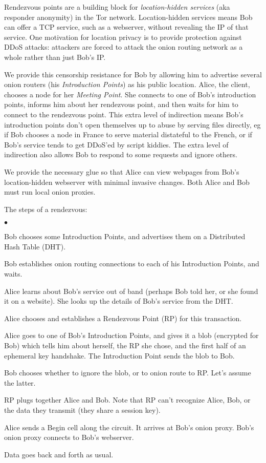 \documentclass[times,10pt,twocolumn]{article}
\newenvironment{tightlist}{\begin{list}{$\bullet$}{
  \setlength{\itemsep}{0mm}
    \setlength{\parsep}{0mm}
    }}{\end{list}}
\begin{document}
\label{sec:rendezvous}

Rendezvous points are a building block for \emph{location-hidden services}
(aka responder anonymity) in the Tor network. Location-hidden services
means Bob can offer a TCP service, such as a webserver, without revealing
the IP of that service. One motivation for location privacy is to provide
protection against DDoS attacks: attackers are forced to attack the
onion routing network as a whole rather than just Bob's IP.

We provide this censorship resistance for Bob by allowing him to
advertise several onion routers (his \emph{Introduction Points}) as his
public location. Alice, the client, chooses a node for her \emph{Meeting
Point}. She connects to one of Bob's introduction points, informs him
about her rendezvous point, and then waits for him to connect to the
rendezvous
point. This extra level of indirection means Bob's introduction points
don't open themselves up to abuse by serving files directly, eg if Bob
chooses a node in France to serve material distateful to the French,
%
%
or if Bob's service tends to get DDoS'ed by script kiddies.
The extra level of indirection also allows Bob to respond to some requests
and ignore others.

We provide the necessary glue so that Alice can view webpages from Bob's
location-hidden webserver with minimal invasive changes. Both Alice and
Bob must run local onion proxies.

The steps of a rendezvous:
\begin{tightlist}
\item Bob chooses some Introduction Points, and advertises them on a
      Distributed Hash Table (DHT).
\item Bob establishes onion routing connections to each of his
      Introduction Points, and waits.
\item Alice learns about Bob's service out of band (perhaps Bob told her,
      or she found it on a website). She looks up the details of Bob's
      service from the DHT.
\item Alice chooses and establishes a Rendezvous Point (RP) for this
      transaction.
\item Alice goes to one of Bob's Introduction Points, and gives it a blob
      (encrypted for Bob) which tells him about herself, the RP
      she chose, and the first half of an ephemeral key handshake. The
      Introduction Point sends the blob to Bob.
\item Bob chooses whether to ignore the blob, or to onion route to RP.
      Let's assume the latter.
\item RP plugs together Alice and Bob. Note that RP can't recognize Alice,
      Bob, or the data they transmit (they share a session key).
\item Alice sends a Begin cell along the circuit. It arrives at Bob's
      onion proxy. Bob's onion proxy connects to Bob's webserver.
\item Data goes back and forth as usual.
\end{tightlist}
\end{document}
